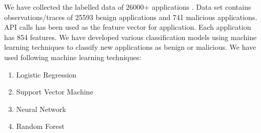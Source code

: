 We have collected the labelled data of 26000+ applications \cite{dataforclassmodel}.
Data set contains observations/traces of 25593 benign applications and 741 malicious applications. API calls has been used as the feature vector for application. Each application has 854 features. We have developed various classification models using machine learning techniques to classify new applications as benign or malicious. We have used following machine learning techniques:
\begin{enumerate}
    \item Logistic Regression
    \item Support Vector Machine
    \item Neural Network
    \item Random Forest
\end{enumerate} 

